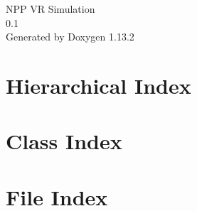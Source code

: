 \documentclass[twoside]{book}
\newcommand{\+}{\discretionary{\mbox{\scriptsize$\hookleftarrow$}}{}{}}
\newcommand{\clearemptydoublepage}{%
    \newpage{\pagestyle{empty}\cleardoublepage}%
  }
\begin{document}
  \raggedbottom
    \hypersetup{pageanchor=false,
                bookmarksnumbered=true,
                pdfencoding=unicode
               }
  \begin{titlepage}
  \vspace*{7cm}
  \begin{center}%
  {\Large NPP VR Simulation}\\
  [1ex]\large 0.\+1 \\
  \vspace*{1cm}
  {\large Generated by Doxygen 1.13.2}\\
  \end{center}
  \end{titlepage}
  \clearemptydoublepage
  \tableofcontents
  \clearemptydoublepage
  \hypersetup{pageanchor=true}
\chapter{Hierarchical Index}

\chapter{Class Index}

\chapter{File Index}

\end{document}
